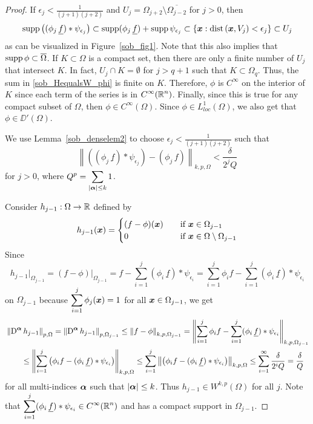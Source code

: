 \begin{proof}
If $\displaystyle \epsilon_j < \frac{1}{(j+1)(j+2)}$ and 
$\displaystyle U_j = \Omega_{j+2} \setminus \overline{\Omega_{j-2}}$
for $j>0$, then
\[
\operatorname{supp} \left( (\phi_j\,\underline{f}) \ast \psi_{\epsilon_j}\right) \subset 
\operatorname{supp} (\phi_j\,\underline{f}) + \operatorname{supp} \psi_{\epsilon_j}
\subset \left\{ {\bm{x}} : \mathrm{dist}\left({\bm{x}},V_j\right) < \epsilon_j \right\}
\subset U_j
\]
as can be visualized in Figure~\ref{sob_fig1}.  Note that this
also implies that $\operatorname{supp} \phi \subset \overline{\Omega}$.  If
$K \subset \Omega$ is a compact set, then there are only a finite
number of $U_j$ that intersect $K$.  In fact, $U_j \cap K = \emptyset$
for $j > q+1$ such that $K \subset \Omega_q$.  Thus, the
sum in \ref{sob_HequalsW_phi} is finite on $K$.  Therefore, $\phi$ is
$\displaystyle C^\infty$ on the interior of $K$ since each term of the
series is in $\displaystyle C^\infty(\mathbb{R}^n)$.  Finally, since this is true
for any compact subset of $\Omega$, then
$\displaystyle \phi \in C^\infty(\Omega)$.
Since $\displaystyle \phi \in L^1_{loc}(\Omega)$, we also get that
$\phi \in \DD'(\Omega)$.

We use Lemma~\ref{sob_denselem2} to choose
$\displaystyle \epsilon_j < \frac{1}{(j+1)(j+2)}$ such that
\[
\left\| \left( (\phi_j\,\underline{f}) \ast \psi_{\epsilon_j}\right)
- (\phi_j\,f) \right\|_{k,p,\Omega}  < \frac{\delta}{2^j Q}
\]
for $j>0$, where $\displaystyle Q^p = \sum_{|{\bm{\alpha}}|\leq k} 1$.

Consider $h_{j-1}:\Omega \to \mathbb{R}$ defined by
\[
h_{j-1}({\bm{x}}) = \begin{cases}
(f-\phi)({\bm{x}}) & \quad \text{if} \ {\bm{x}} \in \Omega_{j-1} \\
0 & \quad \text{if} \ {\bm{x}} \in \Omega \setminus \Omega_{j-1}
\end{cases}
\]
Since
\[
h_{j-1}\big|_{\Omega_{j-1}} = (f - \phi)\big|_{\Omega_{j-1}}
= f - \sum_{i=1}^j (\phi_i\,\underline{f}) \ast \psi_{\epsilon_i}
= \sum_{i=1}^j \phi_i f -
\sum_{i=1}^j (\phi_i\,\underline{f}) \ast \psi_{\epsilon_i}
\]
on $\Omega_{j-1}$ because $\displaystyle \sum_{i=1}^j \phi_j({\bm{x}}) =1$ for
all ${\bm{x}}\in \Omega_{j-1}$, we get
\begin{align}
&\left\|\operatorname{D}^{{\bm{\alpha}}} h_{j-1}\right\|_{p,\Omega}
= \left\|\operatorname{D}^{{\bm{\alpha}}} h_{j-1}\right\|_{p,\Omega_{j-1}}
\leq \left\| f - \phi \right\|_{k,p,\Omega_{j-1}}
= \left\| \sum_{i=1}^j \phi_i f -
\sum_{i=1}^j (\phi_i\,\underline{f}) \ast \psi_{\epsilon_i}
\right\|_{k,p,\Omega_{j-1}} \nonumber \\
&\qquad \leq \left\| \sum_{i=1}^j \left( \phi_i f -
(\phi_i\,\underline{f}) \ast \psi_{\epsilon_i} \right) \right\|_{k,p,\Omega}
\leq \sum_{i=1}^j \left\| \left( \phi_i f -
(\phi_i\,\underline{f}) \ast \psi_{\epsilon_i} \right) \right\|_{k,p,\Omega}
\leq \sum_{i=1}^\infty \frac{\delta}{2^i Q} = \frac{\delta}{Q}
\label{HequalsWEq1}
\end{align}
for all multi-indices ${\bm{\alpha}}$ such that $|{\bm{\alpha}}| \leq k$.
Thus $\displaystyle h_{j-1} \in W^{k,p}(\Omega)$ for all $j$.
Note that
$\displaystyle \sum_{i=1}^j (\phi_i\,\underline{f}) \ast \psi_{\epsilon_i}
\in C^{\infty}(\mathbb{R}^n)$ and has a compact support in $\Omega_{j-1}$.


\end{proof}
